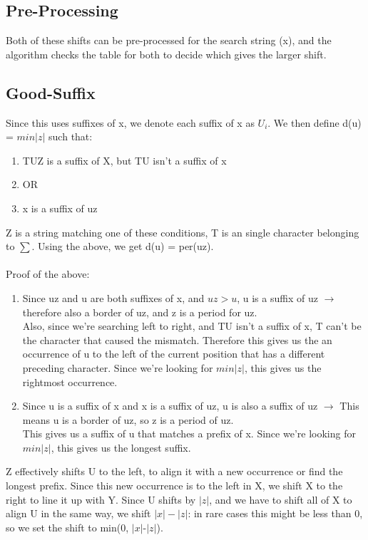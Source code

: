 \subsection{Pre-Processing}
Both of these shifts can be pre-processed for the search string (x), and the algorithm checks the table for both to decide which gives the larger shift. 

\subsection{Good-Suffix}
Since this uses suffixes of x, we denote each suffix of x as $U_i$. We then define d(u) = $min|z|$ such that:
\begin{enumerate}
    \item TUZ is a suffix of X, but TU isn't a suffix of x
    \item [] OR
    \item x is a suffix of uz
\end{enumerate}
Z is a string matching one of these conditions, T is an single character belonging to $\sum$. Using the above, we get d(u) = per(uz).\\ \\
Proof of the above:
\begin{enumerate}
    \item Since uz and u are both suffixes of x, and $uz > u$, u is a suffix of uz $\rightarrow$ therefore also a border of uz, and z is a period for uz. \\ Also, since we're searching left to right, and TU isn't a suffix of x, T can't be the character that caused the mismatch. Therefore this gives us the an occurrence of u to the left of the current position that has a different preceding character. Since we're looking for $min|z|$, this gives us the rightmost occurrence.  
    \item Since u is a suffix of x and x is a suffix of uz, u is also a suffix of uz $\rightarrow$ This means u is a border of uz, so z is a period of uz. \\
    This gives us a suffix of u that matches a prefix of x. Since we're looking for $min|z|$, this gives us the longest suffix.
\end{enumerate}
Z effectively shifts U to the left, to align it with a new occurrence or find the longest prefix. Since this new occurrence is to the left in X, we shift X to the right to line it up with Y. Since U shifts by $|z|$, and we have to shift all of X to align U in the same way, we shift $|x|-|z|$: in rare cases this might be less than 0, so we set the shift to min(0, $|x|$-$|z|$). \\

